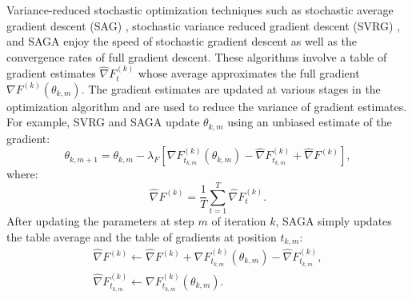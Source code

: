 Variance-reduced stochastic optimization techniques such as stochastic average gradient descent (SAG) \citep{Schmidt:2017}, stochastic variance reduced gradient descent (SVRG) \citep{Johnson:2013}, and SAGA \citep{Defazio:2014} enjoy the speed of stochastic gradient descent as well as the convergence rates of full gradient descent. These algorithms involve a table of gradient estimates $\widehat \nabla F^{(k)}_t$ whose average approximates the full gradient $\nabla F^{(k)}(\theta_{k,m})$. The gradient estimates are updated at various stages in the optimization algorithm and are used to reduce the variance of gradient estimates. 
%
%
For example, SVRG and SAGA update $\theta_{k,m}$ using an unbiased estimate of the gradient:
%
\begin{equation}
    \theta_{k,m+1} = \theta_{k,m} - \lambda_F \left[\nabla F^{(k)}_{t_{k,m}}(\theta_{k,m}) - \widehat \nabla F^{(k)}_{t_{k,m}} + \widehat \nabla F^{(k)} \right],
    \label{eqn:SAGA_update}
\end{equation}
%
where:
%
\begin{equation}
    \widehat \nabla F^{(k)} = \frac{1}{T} \sum_{t=1}^T \widehat \nabla F^{(k)}_{t}.
    \label{eqn:tbl_avg}
\end{equation}
%
%
After updating the parameters at step $m$ of iteration $k$, SAGA simply updates the table average and the table of gradients at position $t_{k,m}$: 
%
\begin{gather}
    \widehat \nabla F^{(k)} \gets \widehat \nabla F^{(k)} + \nabla F^{(k)}_{t_{k,m}}(\theta_{k,m}) - \widehat \nabla F^{(k)}_{t_{k,m}}, \\
    \widehat \nabla F^{(k)}_{t_{k,m}} \gets \nabla F^{(k)}_{t_{k,m}}(\theta_{k,m}).
\end{gather}
%

